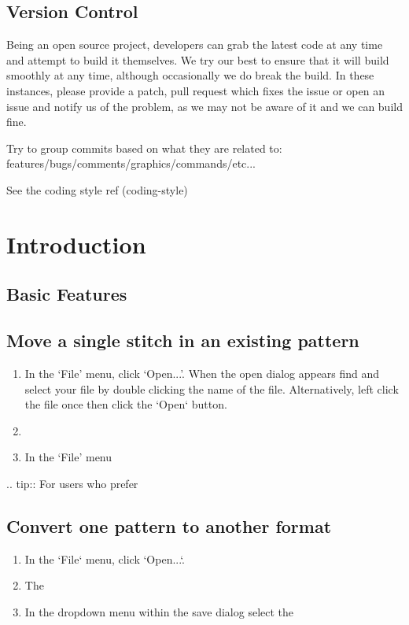 \documentclass[10pt]{report}
\begin{document}
\subsection{Version Control}

Being an open source project, developers can grab the latest code at any time
and attempt to build it themselves. We try our best to ensure that it will build smoothly
at any time, although occasionally we do break the build. In these instances,
please provide a patch, pull request which fixes the issue or open an issue and
notify us of the problem, as we may not be aware of it and we can build fine.

Try to group commits based on what they are related to: features/bugs/comments/graphics/commands/etc...

See the coding style ref (coding-style)

\section{Introduction}

\subsection{Basic Features}

\subsection{Move a single stitch in an existing pattern}

\begin{enumerate}
\item In the `File' menu, click `Open...'. When the open dialog appears find
 and select your file by double clicking the name of the file. Alternatively,
 left click the file once then click the `Open` button.
\item
\item In the `File' menu
\end{enumerate}

.. tip::
   For users who prefer

\subsection{Convert one pattern to another format}

\begin{enumerate}
\item In the `File` menu, click `Open...`.
\item The 
\item In the dropdown menu within the save dialog select the 
\end{enumerate}
\end{document}

